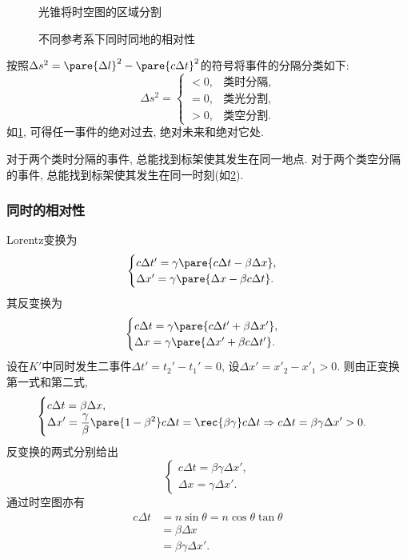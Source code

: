\documentclass[hidelinks]{ctexart}
\begin{document}
\begin{figure}[ht]
    \centering
    \caption{光锥将时空图的区域分割}
    \label{fig:光锥将时空图的区域分割}
\end{figure}
\begin{figure}[ht]
    \centering
    \caption{不同参考系下同时同地的相对性}
    \label{fig:不同参考系下同时同地的相对性}
\end{figure}
按照$\Delta s^2 = \pare{\Delta l}^2 - \pare{c\Delta t}^2$的符号将事件的分隔分类如下:
\[ \Delta s^2 = \begin{cases}
    <0, & \text{类时分隔},\\
    =0, & \text{类光分割},\\
    >0, & \text{类空分割}.
\end{cases} \]
如\cref{fig:光锥将时空图的区域分割}, 可得任一事件的绝对过去, 绝对未来和绝对它处.
\par
对于两个类时分隔的事件, 总能找到标架使其发生在同一地点. 对于两个类空分隔的事件, 总能找到标架使其发生在同一时刻(如\cref{fig:不同参考系下同时同地的相对性}).


\subsubsection{同时的相对性} %
\label{ssub:同时的相对性}

Lorentz变换为
\[ \begin{cases}
    c\Delta t' = \gamma \pare{c\Delta t - \beta \Delta x}, \\
    \Delta x' = \gamma\pare{\Delta x - \beta c\Delta t}.
\end{cases} \]
其反变换为
\[ \begin{cases}
    c\Delta t = \gamma\pare{c\Delta t' + \beta \Delta x'}, \\
    \Delta x = \gamma\pare{\Delta x' + \beta c\Delta t'}.
\end{cases} \]
设在$K'$中同时发生二事件$\Delta t' = t_2' - t_1' = 0$, 设$\Delta x' = x'_2 - x'_1 > 0$. 则由正变换第一式和第二式,
\[ \begin{cases}
    c\Delta t = \beta \Delta x, \\
    \displaystyle \Delta x' = \frac{\gamma}{\beta}\pare{1-\beta^2}c\Delta t = \rec{\beta \gamma}c\Delta t \Rightarrow c\Delta t = \beta \gamma \Delta x' > 0.
\end{cases} \]
反变换的两式分别给出
\[ \begin{cases}
    c\Delta t = \beta \gamma \Delta x',\\
    \Delta x = \gamma \Delta x'.
\end{cases} \]
通过时空图亦有
\begin{align*}
    c\Delta t &= n\sin\theta = n\cos\theta\tan\theta \\
    &= \beta \Delta x \\
    &= \beta \gamma \Delta x'.
\end{align*}
\end{document}
